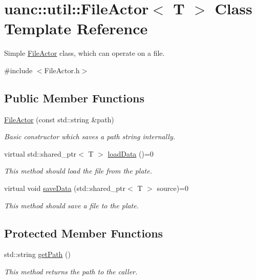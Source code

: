 \hypertarget{classuanc_1_1util_1_1_file_actor}{}\section{uanc\+:\+:util\+:\+:File\+Actor$<$ T $>$ Class Template Reference}
\label{classuanc_1_1util_1_1_file_actor}


Simple \hyperlink{classuanc_1_1util_1_1_file_actor}{File\+Actor} class, which can operate on a file.  




{\ttfamily \#include $<$File\+Actor.\+h$>$}

\subsection*{Public Member Functions}
\begin{DoxyCompactItemize}
\item 
\hyperlink{classuanc_1_1util_1_1_file_actor_a2e2312c707145e6a3d47783fb8fe9fb0}{File\+Actor} (const std\+::string \&path)
\begin{DoxyCompactList}\small\item\em Basic constructor which saves a path string internally. \end{DoxyCompactList}\item 
virtual std\+::shared\+\_\+ptr$<$ T $>$ \hyperlink{classuanc_1_1util_1_1_file_actor_ad2db7584c9332a4d8376ccf6276ec301}{load\+Data} ()=0
\begin{DoxyCompactList}\small\item\em This method should load the file from the plate. \end{DoxyCompactList}\item 
virtual void \hyperlink{classuanc_1_1util_1_1_file_actor_aee5e36b37c46dda87f0499fc7b9e4b0d}{save\+Data} (std\+::shared\+\_\+ptr$<$ T $>$ source)=0
\begin{DoxyCompactList}\small\item\em This method should save a file to the plate. \end{DoxyCompactList}\end{DoxyCompactItemize}
\subsection*{Protected Member Functions}
\begin{DoxyCompactItemize}
\item 
std\+::string \hyperlink{classuanc_1_1util_1_1_file_actor_a9d2cae5553ce72cac745a46a25a946dc}{get\+Path} ()
\begin{DoxyCompactList}\small\item\em This method returns the path to the caller. \end{DoxyCompactList}\end{DoxyCompactItemize}


